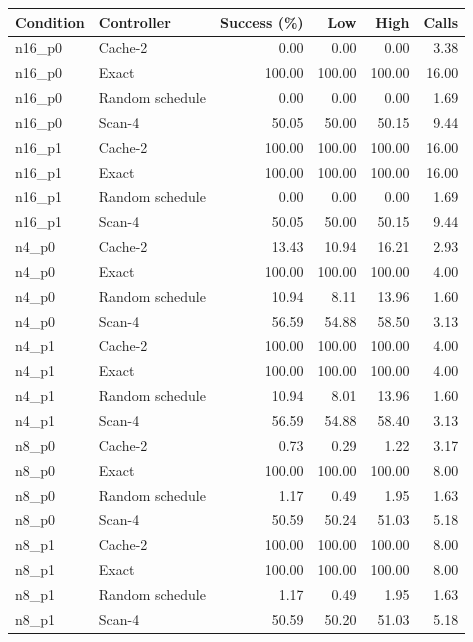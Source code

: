 \begin{longtable}{llrrrr}
\toprule
Condition & Controller & Success (\%) & Low & High & Calls\\
\midrule
\endhead
n16\_p0 & Cache-2 & 0.00 & 0.00 & 0.00 & 3.38\\
n16\_p0 & Exact & 100.00 & 100.00 & 100.00 & 16.00\\
n16\_p0 & Random schedule & 0.00 & 0.00 & 0.00 & 1.69\\
n16\_p0 & Scan-4 & 50.05 & 50.00 & 50.15 & 9.44\\
n16\_p1 & Cache-2 & 100.00 & 100.00 & 100.00 & 16.00\\
n16\_p1 & Exact & 100.00 & 100.00 & 100.00 & 16.00\\
n16\_p1 & Random schedule & 0.00 & 0.00 & 0.00 & 1.69\\
n16\_p1 & Scan-4 & 50.05 & 50.00 & 50.15 & 9.44\\
n4\_p0 & Cache-2 & 13.43 & 10.94 & 16.21 & 2.93\\
n4\_p0 & Exact & 100.00 & 100.00 & 100.00 & 4.00\\
n4\_p0 & Random schedule & 10.94 & 8.11 & 13.96 & 1.60\\
n4\_p0 & Scan-4 & 56.59 & 54.88 & 58.50 & 3.13\\
n4\_p1 & Cache-2 & 100.00 & 100.00 & 100.00 & 4.00\\
n4\_p1 & Exact & 100.00 & 100.00 & 100.00 & 4.00\\
n4\_p1 & Random schedule & 10.94 & 8.01 & 13.96 & 1.60\\
n4\_p1 & Scan-4 & 56.59 & 54.88 & 58.40 & 3.13\\
n8\_p0 & Cache-2 & 0.73 & 0.29 & 1.22 & 3.17\\
n8\_p0 & Exact & 100.00 & 100.00 & 100.00 & 8.00\\
n8\_p0 & Random schedule & 1.17 & 0.49 & 1.95 & 1.63\\
n8\_p0 & Scan-4 & 50.59 & 50.24 & 51.03 & 5.18\\
n8\_p1 & Cache-2 & 100.00 & 100.00 & 100.00 & 8.00\\
n8\_p1 & Exact & 100.00 & 100.00 & 100.00 & 8.00\\
n8\_p1 & Random schedule & 1.17 & 0.49 & 1.95 & 1.63\\
n8\_p1 & Scan-4 & 50.59 & 50.20 & 51.03 & 5.18\\
\bottomrule
\end{longtable}